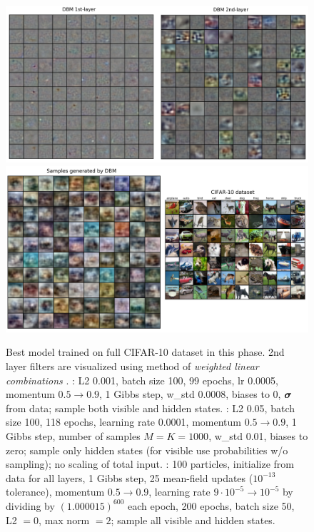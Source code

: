 \begin{figure}[h]
\begin{mdframed}
\centering
\includegraphics[width=5.2in]{dbm-cifar/filters.png}
\\[2em]
\includegraphics[width=5.2in]{dbm-cifar/samples.png}
\caption{Best model trained on full CIFAR-10 dataset in this phase. 2nd layer filters are visualized using method of \emph{weighted linear combinations} \cite{erhan2009visualizing}. : L2 0.001, batch size 100, 99 epochs, lr 0.0005, momentum $0.5\rightarrow 0.9$, 1 Gibbs step, w\_std 0.0008, biases to 0, $\boldsymbol{\sigma}$ from data; sample both visible and hidden states. : L2 0.05, batch size 100, 118 epochs, learning rate 0.0001, momentum $0.5\rightarrow 0.9$, 1 Gibbs step, number of samples $M=K=1000$, w\_std 0.01, biases to zero; sample only hidden states (for visible use probabilities w/o sampling); no scaling of total input. : 100 particles, initialize from data for all layers, 1 Gibbs step, 25 mean-field updates ($10^{-13}$ tolerance), momentum $0.5\rightarrow 0.9$, learning rate $9\cdot10^{-5}\rightarrow 10^{-5}$ by dividing by $(1.000015)^{600}$ each epoch, 200 epochs, batch size 50, L2 $=0$, max norm $=2$; sample all visible and hidden states.}
\end{mdframed}
\end{figure}


